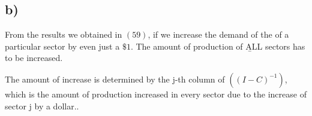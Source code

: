\documentclass[11pt]{article}
\begin{document}
\subsection{b)}
From the results we obtained in $(59)$, if we increase the demand of the of a particular sector by even just a $\$1$. The amount of production of {\b ALL} sectors has to be increased.

The amount of increase is determined by the j-th column of $((I-C)^{-1})$, which is the amount of production increased in every sector due to the increase of sector j by a dollar..
\end{document}
